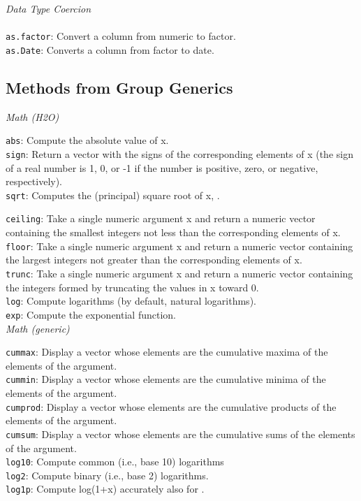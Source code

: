 \documentclass[11pt]{article}
\begin{document}
\begin{enumerate}
{\textit{Data Type Coercion}\\ \\
{\texttt{as.factor}}: Convert a column from numeric to factor.\\
{\texttt{as.Date}}: Converts a column from factor to date.\\

\subsection{Methods from Group Generics}

\textit{Math (H2O)}

{\texttt{abs}}: Compute the absolute value of x. \\
{\texttt{sign}}: Return a vector with the signs of the corresponding elements of x (the sign of a real number is 1, 0, or -1 if the number is positive, zero, or negative, respectively). \\
{\texttt{sqrt}}: Computes the (principal) square root of x, . 

{\texttt{ceiling}}: Take a single numeric argument x and return a numeric vector containing the smallest integers not less than the corresponding elements of x. \\
{\texttt{floor}}: Take a single numeric argument x and return a numeric vector containing the largest integers not greater than the corresponding elements of x. \\
{\texttt{trunc}}: Take a single numeric argument x and return a numeric vector containing the integers formed by truncating the values in x toward 0. \\
{\texttt{log}}: Compute logarithms (by default, natural logarithms). \\
{\texttt{exp}}: Compute the exponential function.\\

\textit{Math (generic)}

{\texttt{cummax}}: Display a vector whose elements are the cumulative maxima of the elements of the argument.\\
{\texttt{cummin}}: Display a vector whose elements are the cumulative minima of the elements of the argument.\\
{\texttt{cumprod}}: Display a vector whose elements are the cumulative products of the elements of the argument. \\
{\texttt{cumsum}}: Display a vector whose elements are the cumulative sums of the elements of the argument.  \\
{\texttt{log10}}: Compute common (i.e., base 10) logarithms \\
{\texttt{log2}}: Compute binary (i.e., base 2) logarithms. \\
{\texttt{log1p}}: Compute log(1+x) accurately also for {}.

}
\end{enumerate}
\end{document}
